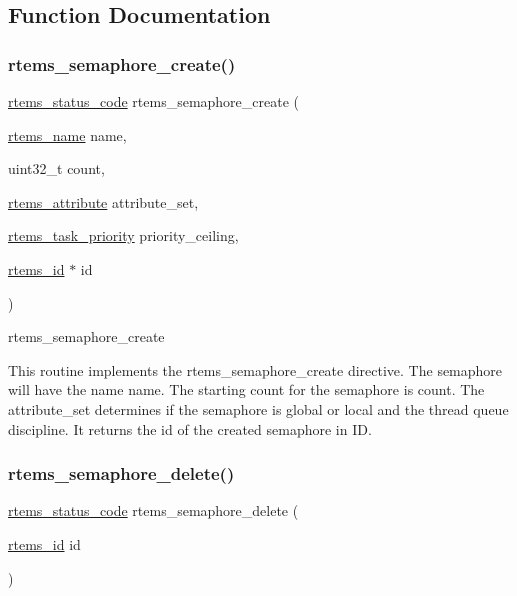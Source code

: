 \subsection{Function Documentation}
\mbox{\label{group__ClassicSem_ga215ed3e3aa56c2f5204edc629985f2aa}} 
\subsubsection{\texorpdfstring{rtems\_semaphore\_create()}{rtems\_semaphore\_create()}}
{\footnotesize\ttfamily \mbox{\hyperlink{group__ClassicStatus_ga545d41846817eaba6143d52ee4d9e9fe}{rtems\+\_\+status\+\_\+code}} rtems\+\_\+semaphore\+\_\+create (\begin{DoxyParamCaption}\item[{\mbox{\hyperlink{group__ClassicTasks_ga55fb63c49f68c0cbd9bee004da15b1fd}{rtems\+\_\+name}}}]{name,  }\item[{uint32\+\_\+t}]{count,  }\item[{\mbox{\hyperlink{group__ClassicAttributes_gaea40313cf78ed843e09c4315d0a10f79}{rtems\+\_\+attribute}}}]{attribute\+\_\+set,  }\item[{\mbox{\hyperlink{group__ClassicTasks_gaa80a0c0938307d1e99d0eb5fee765b47}{rtems\+\_\+task\+\_\+priority}}}]{priority\+\_\+ceiling,  }\item[{\mbox{\hyperlink{group__ClassicTasks_gab20892b814dced7dd4e5b9bf42becd57}{rtems\+\_\+id}} $\ast$}]{id }\end{DoxyParamCaption})}



rtems\+\_\+semaphore\+\_\+create 

This routine implements the rtems\+\_\+semaphore\+\_\+create directive. The semaphore will have the name name. The starting count for the semaphore is count. The attribute\+\_\+set determines if the semaphore is global or local and the thread queue discipline. It returns the id of the created semaphore in ID. \mbox{\label{group__ClassicSem_gabf9631b7132ab4142eff47a1502652a2}} 
\subsubsection{\texorpdfstring{rtems\_semaphore\_delete()}{rtems\_semaphore\_delete()}}
{\footnotesize\ttfamily \mbox{\hyperlink{group__ClassicStatus_ga545d41846817eaba6143d52ee4d9e9fe}{rtems\+\_\+status\+\_\+code}} rtems\+\_\+semaphore\+\_\+delete (\begin{DoxyParamCaption}\item[{\mbox{\hyperlink{group__ClassicTasks_gab20892b814dced7dd4e5b9bf42becd57}{rtems\+\_\+id}}}]{id }\end{DoxyParamCaption})}



